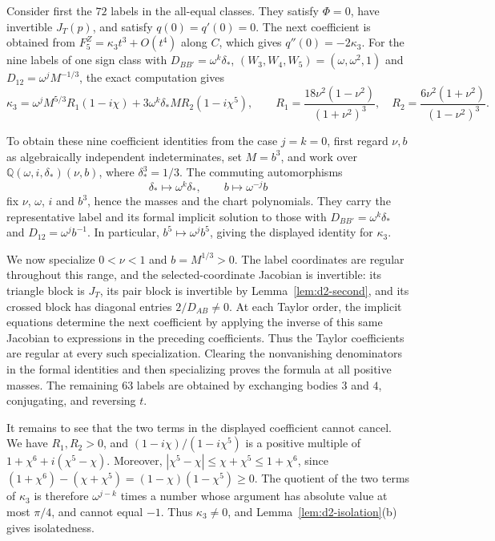 \documentclass[11pt]{amsart}
\theoremstyle{definition}
\theoremstyle{remark}
\begin{document}
{Consider first the $72$ labels in the all-equal classes.
They satisfy $\Phi=0$, have invertible $J_T(p)$, and satisfy $q(0)=q'(0)=0$.
The next coefficient is obtained from $F^Z_5=\kappa_3t^3+O(t^4)$ along $C$, which gives
$q''(0)=-2\kappa_3$.
For the nine labels of one sign class with $D_{BB'}=\omega^k\delta_*$,
$(W_3,W_4,W_5)=(\omega,\omega^2,1)$ and $D_{12}=\omega^jM^{-1/3}$, the exact computation gives}
\[
  \kappa_3=\omega^jM^{5/3}R_1(1-i\chi)+3\omega^k\delta_*MR_2(1-i\chi^5),\qquad
  R_1=\frac{18\nu^2(1-\nu^2)}{(1+\nu^2)^3},\quad R_2=\frac{6\nu^2(1+\nu^2)}{(1-\nu^2)^3}.
\]
{To obtain these nine coefficient identities from the case $j=k=0$, first regard
$\nu,b$ as algebraically independent indeterminates, set $M=b^3$, and work over
$\mathbb Q(\omega,i,\delta_*)(\nu,b)$, where $\delta_*^3=1/3$.
The commuting automorphisms
\[
  \delta_*\mapsto\omega^k\delta_*,\qquad b\mapsto\omega^{-j}b
\]
fix $\nu$, $\omega$, $i$ and $b^3$, hence the masses and the chart polynomials.
They carry the representative label and its formal implicit solution to those with
$D_{BB'}=\omega^k\delta_*$ and $D_{12}=\omega^jb^{-1}$.
In particular, $b^5\mapsto\omega^jb^5$, giving the displayed identity for $\kappa_3$.

We now specialize $0<\nu<1$ and $b=M^{1/3}>0$.
The label coordinates are regular throughout this range, and the selected-coordinate
Jacobian is invertible: its triangle block is $J_T$, its pair block is invertible by
Lemma~\ref{lem:d2-second}, and its crossed block has diagonal entries $2/D_{AB}\ne0$.
At each Taylor order, the implicit equations determine the next coefficient by applying
the inverse of this same Jacobian to expressions in the preceding coefficients.
Thus the Taylor coefficients are regular at every such specialization.
Clearing the nonvanishing denominators in the formal identities and then specializing
proves the formula at all positive masses.
The remaining $63$ labels are obtained by exchanging bodies $3$ and $4$, conjugating,
and reversing $t$.

It remains to see that the two terms in the displayed coefficient cannot cancel.
We have $R_1,R_2>0$, and $(1-i\chi)/(1-i\chi^5)$ is a positive multiple of
$1+\chi^6+i(\chi^5-\chi)$.
Moreover, $|\chi^5-\chi|\le\chi+\chi^5\le1+\chi^6$, since
$(1+\chi^6)-(\chi+\chi^5)=(1-\chi)(1-\chi^5)\ge0$.
The quotient of the two terms of $\kappa_3$ is therefore $\omega^{j-k}$ times a number
whose argument has absolute value at most $\pi/4$, and cannot equal $-1$.
Thus $\kappa_3\ne0$, and Lemma~\ref{lem:d2-isolation}(b) gives isolatedness.}
\end{document}
